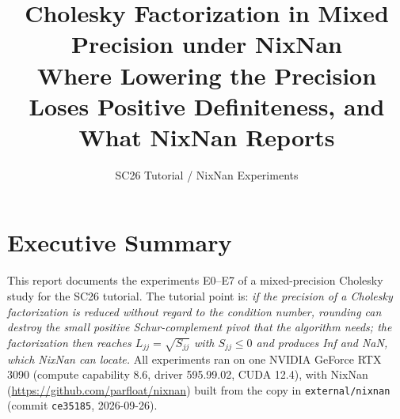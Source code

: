 \documentclass[11pt,a4paper]{article}
\title{Cholesky Factorization in Mixed Precision under NixNan\\
\large Where Lowering the Precision Loses Positive Definiteness, and What NixNan Reports}
\author{SC26 Tutorial / NixNan Experiments}
\date{}
\begin{document}
\maketitle

\section{Executive Summary}

This report documents the experiments E0--E7 of a mixed-precision Cholesky study for the SC26 tutorial. The tutorial
point is: \emph{if the precision of a Cholesky factorization is reduced without regard to the condition number, rounding can destroy the
small positive Schur-complement pivot that the algorithm needs; the factorization then reaches
$L_{jj}=\sqrt{S_{jj}}$ with $S_{jj}\le 0$ and produces Inf and NaN, which NixNan can locate.} All experiments ran on one NVIDIA GeForce RTX 3090
(compute capability 8.6, driver 595.99.02, CUDA 12.4), with NixNan (\url{https://github.com/parfloat/nixnan}) built from
the copy in \texttt{external/nixnan} (commit \texttt{ce35185}, 2026-09-26).
\end{document}
